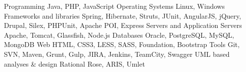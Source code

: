 

\begin{cvskills}

  \cvskill
    {Programming} %
    {Java, PHP, JavaScript} %
  \cvskill
    {Operating Systems} %
    {Linux, Windows} %
  \cvskill
    {Frameworks and libraries} %
    {Spring, Hibernate, Struts, JUnit, AngularJS, jQuery, Drupal, Silex, PHPUnit, Apache POI, Express} %
  \cvskill
    {Servers and Application Servers} %
    {Apache, Tomcat, Glassfish, Node.js} %
  \cvskill
    {Databases} %
    {Oracle, PostgreSQL, MySQL, MongoDB} %
  \cvskill
    {Web} %
    {HTML, CSS3, LESS, SASS, Foundation, Bootstrap} %
  \cvskill
    {Tools} %
    {Git, SVN, Maven, Grunt, Gulp, JIRA, Jenkins, TeamCity, Swagger} %
  \cvskill
    {UML based analyses \& design} %
    {Rational Rose, ARIS, Umlet} %
\end{cvskills}

